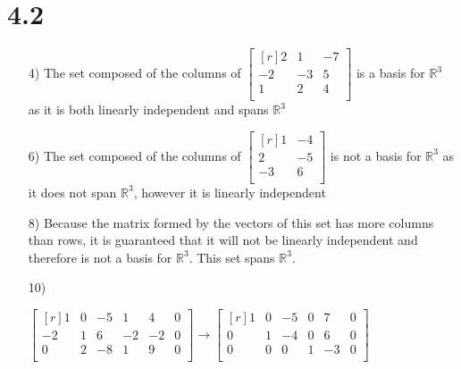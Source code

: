 \documentclass{article}
\begin{document}
  \section* {4.2}
  \begin{enumerate}

    \item[4)]
      The set composed of the columns of
      $\begin{bmatrix*}[r]
      2&1&-7\\
      -2&-3&5\\
      1&2&4\\
      \end{bmatrix*}$ is a basis for $\mathbb{R}^3$ as it is
      both linearly independent and spans $\mathbb{R}^3$

    \item[6)]
      The set composed of the columns of
      $\begin{bmatrix*}[r]
      1&-4\\
      2&-5\\
      -3&6\\
      \end{bmatrix*}$ is not a basis for $\mathbb{R}^3$ as it 
      does not span $\mathbb{R}^3$, however it is linearly independent 
    
    \item[8)]
      Because the matrix formed by the vectors of this set has
      more columns than rows, it is guaranteed that it will not
      be linearly independent and therefore is not a basis for
      $\mathbb{R}^3$. This set spans $\mathbb{R}^3$.

    \item[10)]

      $\begin{bmatrix*}[r]
      1&0&-5&1&4&0\\
      -2&1&6&-2&-2&0\\
      0&2&-8&1&9&0\\
      \end{bmatrix*}\rightarrow
      \begin{bmatrix*}[r]
      1&0&-5&0&7&0\\
      0&1&-4&0&6&0\\
      0&0&0&1&-3&0\\
      \end{bmatrix*}$


\end{enumerate}
\end{document}
